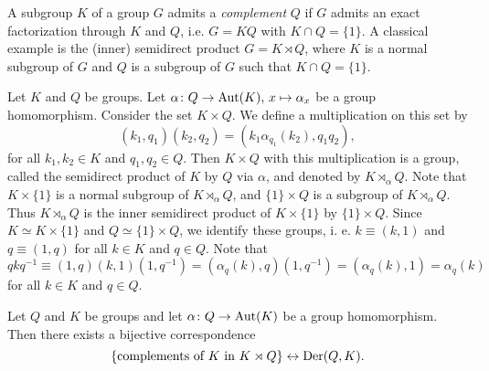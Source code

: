 A subgroup $K$ of a group $G$ admits a {\em complement} $Q$ if $G$ admits an exact factorization 
through $K$ and $Q$, i.e. $G=KQ$ with $K\cap Q=\{1\}$. 
A classical example is the (inner) semidirect product $G=K\rtimes Q$, where $K$ is a normal subgroup of $G$ 
and $Q$ is a subgroup of $G$ such that $K\cap Q=\{1\}$. 

Let $K$ and $Q$ be groups. Let $\alpha\colon Q\rightarrow \operatorname{Aut}(K),\,x\mapsto \alpha_x$ be a group homomorphism. Consider the set $K\times Q$. We define a multiplication on this set by
\[(k_1,q_1)(k_2,q_2)=(k_1\alpha_{q_1}(k_2),q_1q_2),\]
for all $k_1,k_2\in K$ and $q_1,q_2\in Q$. Then $K\times Q$ with this multiplication is a group, called the semidirect product of $K$ by $Q$ via $\alpha$, and denoted by $K\rtimes_{\alpha}Q$. Note that $K\times\{ 1\}$ is a normal subgroup of $K\rtimes_{\alpha}Q$, and $\{1\}\times Q$ is a subgroup of $K\rtimes_{\alpha}Q$. Thus $K\rtimes_{\alpha}Q$ is the inner semidirect product of $K\times\{ 1\}$ by $\{1\}\times Q$. Since $K\simeq K\times\{ 1\}$ and $Q\simeq \{1\}\times Q$, we identify these groups, i. e. $k\equiv (k,1)$ and $q\equiv (1,q)$ for all $k\in K$ and $q\in Q$. Note that
\[ 
qkq^{-1}\equiv (1,q)(k,1)(1,q^{-1})=(\alpha_q(k),q)(1,q^{-1})=(\alpha_q(k),1)=\alpha_q(k)
\]
for all $k\in K$ and $q\in Q$.

\begin{theorem}
	\label{thm:complements}
	Let $Q$ and $K$ be groups and let $\alpha\colon Q\rightarrow \operatorname{Aut} (K)$ be a
	group homomorphism. Then there exists a bijective correspondence
	\[
	\{\text{complements of $K$ in $K\rtimes Q$}\}\leftrightarrow\operatorname{Der}(Q,K).
	\]
\end{theorem}

